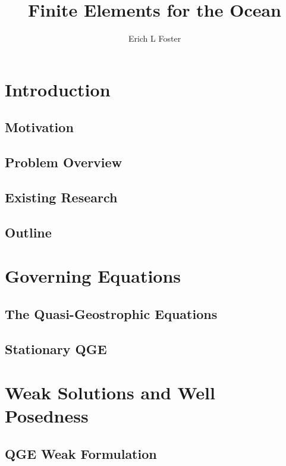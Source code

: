 \documentclass{VTthesis}
\title{
  Finite Elements for the Ocean
}
\author{Erich L Foster}
\begin{document}
  \frontmatter
  \maketitle
  \tableofcontents
  \listoftables
  \listoffigures

  \mainmatter

  \chapter{Introduction} \label{ch:Intro}
    \section{Motivation} \label{sec:Motivation}
    
    \section{Problem Overview}
    
    \section{Existing Research}
    
    \section{Outline}
    

  \chapter{Governing Equations} \label{ch:Model}
    \section{The Quasi-Geostrophic Equations} \label{sec:QGE}
    
    \section{Stationary QGE} \label{sec:SQGE}
    

  \chapter{Weak Solutions and Well Posedness} \label{ch:WellPosed}
    \section{QGE Weak Formulation} \label{sec:QGEWeak}
    
\end{document}

